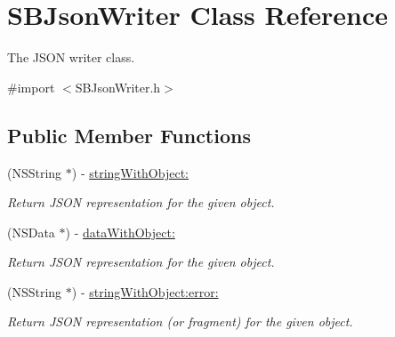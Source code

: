 \hypertarget{interface_s_b_json_writer}{
\section{SBJsonWriter Class Reference}
\label{interface_s_b_json_writer}
}


The JSON writer class.  




{\ttfamily \#import $<$SBJsonWriter.h$>$}

\subsection*{Public Member Functions}
\begin{DoxyCompactItemize}
\item 
(NSString $\ast$) -\/ \hyperlink{interface_s_b_json_writer_a98b0a676d8bc77281759765a5cc847fc}{stringWithObject:}
\begin{DoxyCompactList}\small\item\em Return JSON representation for the given object. \item\end{DoxyCompactList}\item 
(NSData $\ast$) -\/ \hyperlink{interface_s_b_json_writer_a3f1687aa567c4a82cb7233b512d9802b}{dataWithObject:}
\begin{DoxyCompactList}\small\item\em Return JSON representation for the given object. \item\end{DoxyCompactList}\item 
(NSString $\ast$) -\/ \hyperlink{interface_s_b_json_writer_aaf36e759fdf6bfbada41d011ed402245}{stringWithObject:error:}
\begin{DoxyCompactList}\small\item\em Return JSON representation (or fragment) for the given object. \item\end{DoxyCompactList}\end{DoxyCompactItemize}
